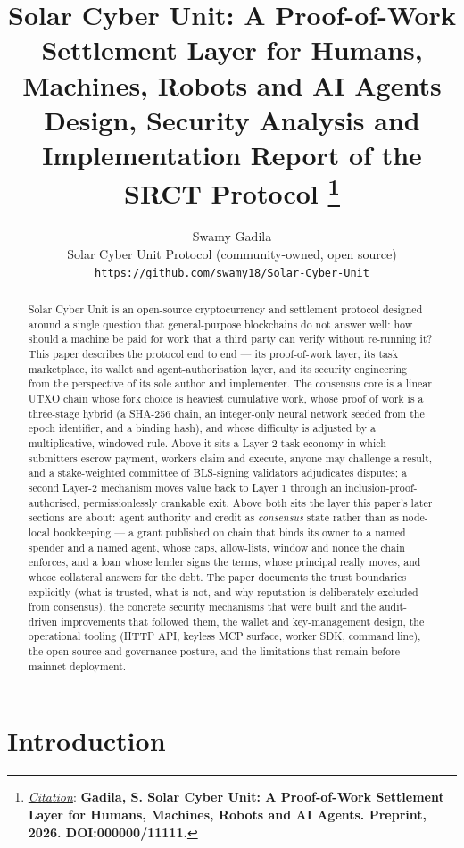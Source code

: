 \documentclass{article}
\title{Solar Cyber Unit: A Proof-of-Work Settlement Layer for Humans, Machines, Robots
and AI Agents\\
{\large Design, Security Analysis and Implementation Report of the SRCT Protocol}
\thanks{\textit{\underline{Citation}}: 
\textbf{Gadila, S. Solar Cyber Unit: A Proof-of-Work Settlement Layer for Humans, Machines,
Robots and AI Agents. Preprint, 2026. DOI:000000/11111.}} 
}
\author{
  Swamy Gadila \\
  Solar Cyber Unit Protocol (community-owned, open source) \\
  \texttt{https://github.com/swamy18/Solar-Cyber-Unit} \\
}
\begin{document}
\maketitle


\begin{abstract}
Solar Cyber Unit is an open-source cryptocurrency and settlement protocol designed around a
single question that general-purpose blockchains do not answer well: how should a
machine be paid for work that a third party can verify without re-running it? This
paper describes the protocol end to end --- its proof-of-work layer, its task
marketplace, its wallet and agent-authorisation layer, and its security
engineering --- from the perspective of its sole author and implementer. The
consensus core is a linear UTXO chain whose fork choice is heaviest cumulative
work, whose proof of work is a three-stage hybrid (a SHA-256 chain, an
integer-only neural network seeded from the epoch identifier, and a binding
hash), and whose difficulty is adjusted by a multiplicative, windowed rule. Above
it sits a Layer-2 task economy in which submitters escrow payment, workers claim
and execute, anyone may challenge a result, and a stake-weighted committee of
BLS-signing validators adjudicates disputes; a second Layer-2 mechanism moves
value back to Layer 1 through an inclusion-proof-authorised, permissionlessly
crankable exit. Above both sits the layer this paper's later sections are
about: agent authority and credit as \emph{consensus} state rather than as
node-local bookkeeping --- a grant published on chain that binds its owner to a
named spender and a named agent, whose caps, allow-lists, window and nonce the
chain enforces, and a loan whose lender signs the terms, whose principal
really moves, and whose collateral answers for the debt. The paper documents the
trust boundaries explicitly (what is trusted, what is not, and why reputation is
deliberately excluded from consensus),
the concrete security mechanisms that were built and the audit-driven improvements
that followed them, the wallet and key-management design, the operational tooling
(HTTP API, keyless MCP surface, worker SDK, command line), the open-source and
governance
posture, and the limitations that remain before mainnet deployment.
\end{abstract}




\section{Introduction}
\label{sec:intro}
\end{document}
